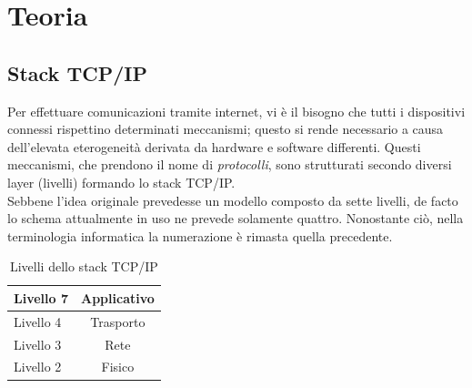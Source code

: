 \chapter{Teoria}

\section{Stack TCP/IP}
Per effettuare comunicazioni tramite internet, vi è il bisogno che tutti i dispositivi connessi rispettino determinati meccanismi; questo si rende necessario a causa dell'elevata eterogeneità derivata da hardware e software differenti.
Questi meccanismi, che prendono il nome di \textit{protocolli}, sono strutturati secondo diversi layer (livelli) formando lo stack TCP/IP.  \\
Sebbene l'idea originale prevedesse un modello composto da sette livelli, de facto lo schema attualmente in uso ne prevede solamente quattro. Nonostante ciò, nella terminologia informatica la numerazione è rimasta quella precedente.

\begin{table}[htb]
	\centering
	\begin{tabular}{| l | c |}
		\hline
		Livello 7 & Applicativo
		\\
		\hline
		Livello 4 & Trasporto
		\\
		\hline
		Livello 3 & Rete
		\\
		\hline
		Livello 2 & Fisico
		\\
		\hline
		
	\end{tabular}
	\caption{Livelli dello stack TCP/IP}
	\label{tab:stack}
\end{table}

